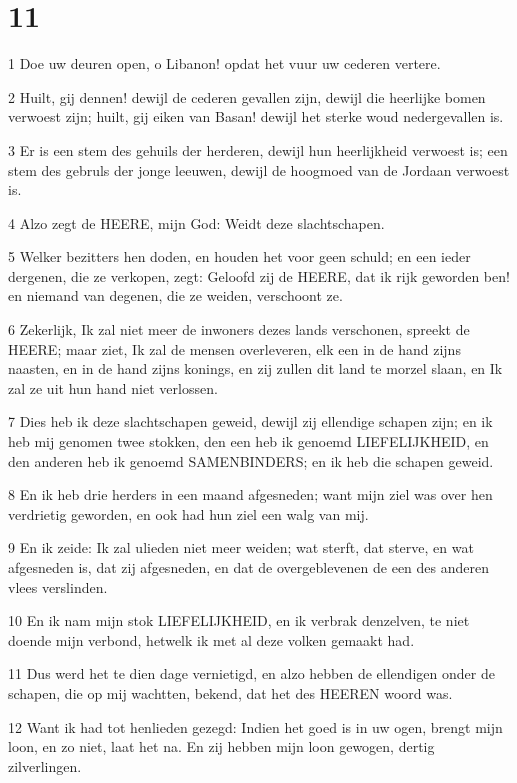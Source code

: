 \chapter{11}

\par 1 Doe uw deuren open, o Libanon! opdat het vuur uw cederen vertere.
\par 2 Huilt, gij dennen! dewijl de cederen gevallen zijn, dewijl die heerlijke bomen verwoest zijn; huilt, gij eiken van Basan! dewijl het sterke woud nedergevallen is.
\par 3 Er is een stem des gehuils der herderen, dewijl hun heerlijkheid verwoest is; een stem des gebruls der jonge leeuwen, dewijl de hoogmoed van de Jordaan verwoest is.
\par 4 Alzo zegt de HEERE, mijn God: Weidt deze slachtschapen.
\par 5 Welker bezitters hen doden, en houden het voor geen schuld; en een ieder dergenen, die ze verkopen, zegt: Geloofd zij de HEERE, dat ik rijk geworden ben! en niemand van degenen, die ze weiden, verschoont ze.
\par 6 Zekerlijk, Ik zal niet meer de inwoners dezes lands verschonen, spreekt de HEERE; maar ziet, Ik zal de mensen overleveren, elk een in de hand zijns naasten, en in de hand zijns konings, en zij zullen dit land te morzel slaan, en Ik zal ze uit hun hand niet verlossen.
\par 7 Dies heb ik deze slachtschapen geweid, dewijl zij ellendige schapen zijn; en ik heb mij genomen twee stokken, den een heb ik genoemd LIEFELIJKHEID, en den anderen heb ik genoemd SAMENBINDERS; en ik heb die schapen geweid.
\par 8 En ik heb drie herders in een maand afgesneden; want mijn ziel was over hen verdrietig geworden, en ook had hun ziel een walg van mij.
\par 9 En ik zeide: Ik zal ulieden niet meer weiden; wat sterft, dat sterve, en wat afgesneden is, dat zij afgesneden, en dat de overgeblevenen de een des anderen vlees verslinden.
\par 10 En ik nam mijn stok LIEFELIJKHEID, en ik verbrak denzelven, te niet doende mijn verbond, hetwelk ik met al deze volken gemaakt had.
\par 11 Dus werd het te dien dage vernietigd, en alzo hebben de ellendigen onder de schapen, die op mij wachtten, bekend, dat het des HEEREN woord was.
\par 12 Want ik had tot henlieden gezegd: Indien het goed is in uw ogen, brengt mijn loon, en zo niet, laat het na. En zij hebben mijn loon gewogen, dertig zilverlingen.
